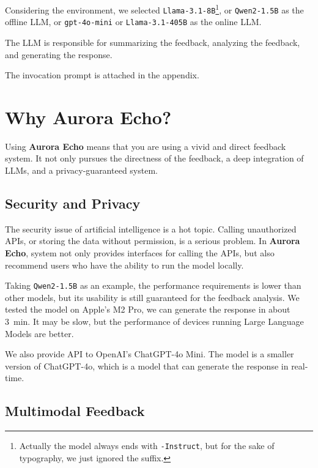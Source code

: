 \documentclass{article}
\begin{document}
    Considering the environment, we selected \texttt{Llama-3.1-8B}\cite{llama3modelcard,llama-3.1}\footnote[1]{Actually the model always ends with \texttt{-Instruct}, but for the sake of typography, we just ignored the suffix.}, or \texttt{Qwen2-1.5B}\cite{qwen2} as the offline LLM, or \texttt{gpt-4o-mini}\cite{gpt-4o-mini} or \texttt{Llama-3.1-405B} as the online LLM\@.

    The LLM is responsible for summarizing the feedback, analyzing the feedback, and generating the response.

    The invocation prompt is attached in the appendix.

    \section{Why Aurora Echo?}\label{sec:why}

    Using \textbf{Aurora Echo} means that you are using a vivid and direct feedback system.
    It not only pursues the directness of the feedback, a deep integration of LLMs, and a privacy-guaranteed system.

    \subsection{Security and Privacy}\label{subsec:security}

    The security issue of artificial intelligence is a hot topic.
    Calling unauthorized APIs, or storing the data without permission, is a serious problem.
    In \textbf{Aurora Echo}, system not only provides interfaces for calling the APIs, but also recommend users who have the ability to run the model locally.

    Taking \texttt{Qwen2-1.5B} as an example, the performance requirements is lower than other models, but its usability is still guaranteed for the feedback analysis.
    We tested the model on Apple's M2 Pro, we can generate the response in about \qty{3}{\minute}.
    It may be slow, but the performance of devices running Large Language Models are better.

    We also provide API to OpenAI's ChatGPT-4o Mini.
    The model is a smaller version of ChatGPT-4o, which is a model that can generate the response in real-time.

    \subsection{Multimodal Feedback}\label{subsec:multimodal}
\end{document}
